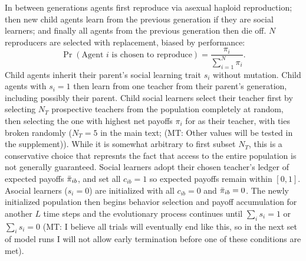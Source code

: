 \documentclass[letterpaper,11.5pt]{scrartcl}
\newcommand{\mt}[1]{{\textcolor{myorange} {({\tiny MT:} #1)}}}
\begin{document}
In between generations agents first reproduce via asexual haploid reproduction; 
then new child agents learn from the
previous generation if they are social learners; and finally all agents from the
previous generation then die off. $N$ reproducers are selected with replacement, 
biased by performance:
\begin{equation}
  \Pr(\text{Agent $i$ is chosen to reproduce}) = \frac{\pi_i}{\sum_{i=1}^N \pi_i}.
\end{equation}
\noindent
Child agents inherit their parent's social learning trait $s_i$ without mutation.
Child agents with $s_i = 1$ then learn from one teacher from their parent's
generation, including possibly their parent. Child social learners select
their teacher first by selecting $N_T$ prospective teachers from the 
population completely at random, then selecting the one with highest
net payoffs $\pi_i$ for as their teacher, with ties broken randomly 
($N_T = 5$ in the main text;
\mt{Other values will be tested in the supplement}). While it is somewhat
arbitrary to first subset $N_T$, this is a conservative choice that
represnts the fact that access to the entire population is not generally
guaranteed. Social learners adopt their chosen teacher's ledger of 
expected payoffs $\bar\pi_{ib}$, and set
all $c_{ib} = 1$ so expected payoffs remain within $[0, 1]$. 
Asocial learners ($s_i = 0$) are initialized with all $c_{ib} = 0$ and
$\bar\pi_{ib} = 0$. The newly initialized population then begins behavior selection
and payoff accumulation for another $L$ time steps and the evolutionary process
continues until $\sum_i s_i = 1$ or $\sum_i s_i = 0$ \mt{I believe
all trials will eventually end like this, so in the next set of model runs I will
not allow early termination before one of these conditions are met}.
\end{document}
